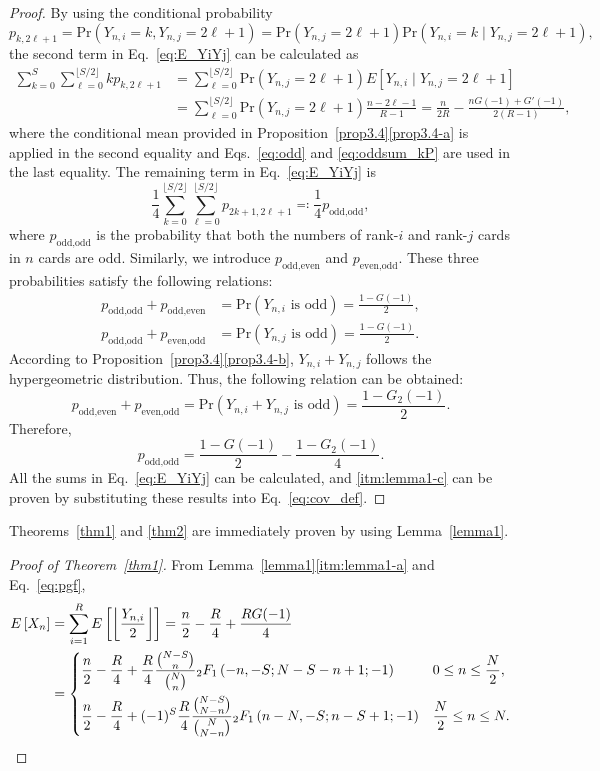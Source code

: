 \documentclass[pre, amsmath, floatfix]{revtex4-2}
\theoremstyle{plain}
\theoremstyle{definition}
\theoremstyle{remark}
\newcommand{\Prob}[1]{\mathrm{Pr}\left(#1\right)} %
\newcommand{\E}[1]{E\left[#1\right]} %
\newcommand{\GaussFsymbol}{{}_2F_1} %
\newcommand{\GaussF}[4]{\GaussFsymbol\left(#1, #2; #3; #4\right)} %
\begin{document}
\begin{proof}
By using the conditional probability
\[
p_{k, 2\ell+1}=\Prob{Y_{n,i}=k, Y_{n,j}=2\ell+1}=\Prob{Y_{n,j}=2\ell+1}\Prob{Y_{n,i}=k\mid Y_{n,j}=2\ell+1},
\]
the second term in Eq.~\eqref{eq:E_YiYj} can be calculated as
\begin{align*}
\sum_{k=0}^S\sum_{\ell=0}^{\lfloor S/2\rfloor}kp_{k, 2\ell+1}
&=\sum_{\ell=0}^{\lfloor S/2\rfloor}\Prob{Y_{n,j}=2\ell+1}\E{Y_{n,i}\mid Y_{n,j}=2\ell+1}\\
&=\sum_{\ell=0}^{\lfloor S/2\rfloor}\Prob{Y_{n,j}=2\ell+1}\frac{n-2\ell-1}{R-1}
=\frac{n}{2R}-\frac{nG(-1)+G'(-1)}{2(R-1)},
\end{align*}
where the conditional mean provided in Proposition~\ref{prop3.4}\ref{prop3.4-a} is applied in the second equality and Eqs.~\eqref{eq:odd} and \eqref{eq:oddsum_kP} are used in the last equality.
The remaining term in Eq.~\eqref{eq:E_YiYj} is
\[
\frac{1}{4}\sum_{k=0}^{\lfloor S/2\rfloor}\sum_{\ell=0}^{\lfloor S/2\rfloor}p_{2k+1, 2\ell+1}\eqqcolon \frac{1}{4}p_{\text{odd},\text{odd}},
\]
where $p_{\text{odd},\text{odd}}$ is the probability that both the numbers of rank-$i$ and rank-$j$ cards in $n$ cards are odd.
Similarly, we introduce $p_{\text{odd},\text{even}}$ and $p_{\text{even},\text{odd}}$.
These three probabilities satisfy the following relations:
\begin{align*}
p_{\text{odd},\text{odd}}+p_{\text{odd},\text{even}}&=\Prob{\text{$Y_{n,i}$ is odd}}=\frac{1-G(-1)}{2},\\
p_{\text{odd},\text{odd}}+p_{\text{even},\text{odd}}&=\Prob{\text{$Y_{n,j}$ is odd}}=\frac{1-G(-1)}{2}.
\end{align*}
According to Proposition~\ref{prop3.4}\ref{prop3.4-b}, $Y_{n,i}+Y_{n,j}$ follows the hypergeometric distribution.
Thus, the following relation can be obtained:
\[
p_{\text{odd},\text{even}}+p_{\text{even},\text{odd}}=\Prob{\text{$Y_{n,i}+Y_{n,j}$ is odd}}=\frac{1-G_2(-1)}{2}.
\]
Therefore,
\[
p_{\text{odd},\text{odd}}=\frac{1-G(-1)}{2}-\frac{1-G_2(-1)}{4}.
\]
All the sums in Eq.~\eqref{eq:E_YiYj} can be calculated, and \ref{itm:lemma1-c} can be proven by substituting these results into Eq.~\eqref{eq:cov_def}.
\end{proof}

Theorems~\ref{thm1} and \ref{thm2} are immediately proven by using Lemma~\ref{lemma1}.

\begin{proof}[Proof of Theorem~\ref{thm1}]
From Lemma~\ref{lemma1}\ref{itm:lemma1-a} and Eq.~\eqref{eq:pgf},
\begin{align}
\E{X_n}&=\sum_{i=1}^R \E{\left\lfloor\frac{Y_{n,i}}{2}\right\rfloor}=\frac{n}{2}-\frac{R}{4}+\frac{RG(-1)}{4}\label{eq:proof_E}\\
&=\begin{dcases}
\frac{n}{2}-\frac{R}{4}+ \frac{R}{4}\frac{\binom{N-S}{n}}{\binom{N}{n}}\GaussF{-n}{-S}{N-S-n+1}{-1} & 0\le n\le\frac{N}{2},\\
\frac{n}{2}-\frac{R}{4}+(-1)^S\frac{R}{4}\frac{\binom{N-S}{N-n}}{\binom{N}{N-n}}\GaussF{n-N}{-S}{n-S+1}{-1} & \frac{N}{2}\le n\le N.
\end{dcases}\nonumber
\end{align}
\end{proof}
\end{document}
